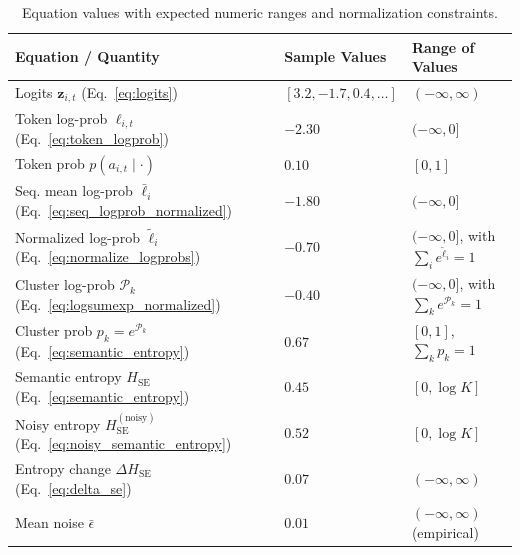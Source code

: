 \documentclass{article}
\begin{document}
\begin{table}[h]
\centering
\small
\begin{tabular}{p{} p{} p{}}
\toprule
\textbf{Equation / Quantity} & \textbf{Sample Values} & \textbf{Range of Values} \\
\midrule
Logits $\boldsymbol{z}_{i,t}$ (Eq.~\ref{eq:logits}) & $[3.2, -1.7, 0.4, \ldots]$ & $(-\infty, \infty)$ \\
Token log-prob $\ell_{i,t}$ (Eq.~\ref{eq:token_logprob}) & $-2.30$ & $(-\infty, 0]$ \\
Token prob $p(a_{i,t}\mid \cdot)$ & $0.10$ & $[0,1]$ \\
Seq. mean log-prob $\bar{\ell}_i$ (Eq.~\ref{eq:seq_logprob_normalized}) & $-1.80$ & $(-\infty, 0]$ \\
Normalized log-prob $\tilde{\ell}_i$ (Eq.~\ref{eq:normalize_logprobs}) & $-0.70$ & $(-\infty, 0]$, with $\sum_i e^{\tilde{\ell}_i}=1$ \\
Cluster log-prob $\mathcal{P}_k$ (Eq.~\ref{eq:logsumexp_normalized}) & $-0.40$ & $(-\infty, 0]$, with $\sum_k e^{\mathcal{P}_k}=1$ \\
Cluster prob $p_k=e^{\mathcal{P}_k}$ (Eq.~\ref{eq:semantic_entropy}) & $0.67$ & $[0,1]$, $\sum_k p_k=1$ \\
Semantic entropy $H_{\text{SE}}$ (Eq.~\ref{eq:semantic_entropy}) & $0.45$ & $[0, \log K]$ \\
Noisy entropy $H_{\text{SE}}^{(\text{noisy})}$ (Eq.~\ref{eq:noisy_semantic_entropy}) & $0.52$ & $[0, \log K]$ \\
Entropy change $\Delta H_{\text{SE}}$ (Eq.~\ref{eq:delta_se}) & $0.07$ & $(-\infty, \infty)$ \\
Mean noise $\bar{\epsilon}$ & $0.01$ & $(-\infty, \infty)$ (empirical) \\
\bottomrule
\end{tabular}
\caption{Equation values with expected numeric ranges and normalization constraints.}
\label{tab:equation_ranges}
\end{table}
\end{document}
